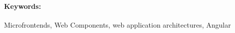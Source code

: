 \documentclass[12pt, oneside]{book}  %
\begin{document}
\paragraph*{Keywords:} Microfrontends, Web Components, web application architectures, Angular

%
%
%
%



\newpage 

\tableofcontents



\newpage 

\listoffigures
\listoftables
\lstlistoflistings


\mainmatter
\pagestyle{headings}

 









\newpage	

\backmatter

\thispagestyle{empty}
\clearpage


 



%
%
%
\end{document}
